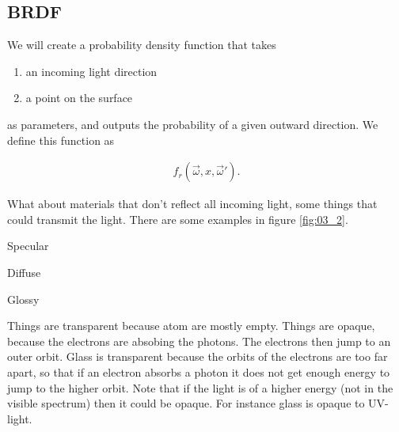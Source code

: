 \documentclass[../pbr.tex]{subfile}
\begin{document}
\subsection{BRDF}%
\label{sub:brdf}

We will create a probability density function that takes
\begin{enumerate}
  \item an incoming light direction
  \item a point on the surface
\end{enumerate}
as parameters, and outputs the probability of a given outward direction. We
define this function as

\begin{definition}
  \begin{align*}
    f_r\left(\vec{\omega},x,\vec{\omega}'\right).
  \end{align*}
\end{definition}

What about materials that don't reflect all incoming light, some things that
could transmit the light. There are some examples in figure \ref{fig:03_2}.

\begin{Figure}
  \begin{center}
    \centering
    \begin{minipage}{0.3\textwidth}
      \begin{center}
        
        Specular
      \end{center}
    \end{minipage}
    \begin{minipage}{0.3\textwidth}
      \begin{center}
        
        Diffuse
      \end{center}
    \end{minipage}
    \begin{minipage}{0.3\textwidth}
      \begin{center}
        
        Glossy
      \end{center}
    \end{minipage}
  \end{center}
  \label{fig:03_2}
\end{Figure}

Things are transparent because atom are mostly empty. Things are opaque,
because the electrons are absobing the photons. The electrons then jump to an
outer orbit. Glass is transparent because the orbits of the electrons are too
far apart, so that if an electron absorbs a photon it does not get enough
energy to jump to the higher orbit. Note that if the light is of a higher
energy (not in the visible spectrum) then it could be opaque. For instance
glass is opaque to UV-light.
\end{document}
